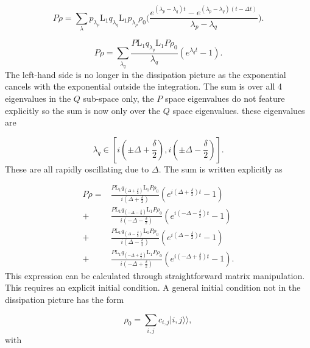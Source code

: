 \documentclass[12pt]{article}
\newcommand{\superket}[1]{|#1\rangle\rangle}
\begin{document}
\begin{equation}
    P\dot{\rho}=\sum_{\lambda} p_{\lambda_p} \mathrm{L}_1  q_{\lambda_q}\mathrm{L}_1p_{\lambda_p} \rho_0\Bigg(\frac{e^{(\lambda_p-\lambda_q)t}-e^{(\lambda_p-\lambda_q)(t-\Delta t)}}{\lambda_p-\lambda_q}\Bigg).
\end{equation}

\begin{equation}\label{eq:ProyectedEqNoAdiabatic}
    P\dot{\rho} = \sum_{\lambda_q} \frac{P \mathrm{L}_1  q_{\lambda_q}\mathrm{L}_1P\rho_0}{\lambda_q} (e^{\lambda_q t} -1).
\end{equation} The left-hand side is no longer in the dissipation picture as the exponential cancels with the exponential outside the integration. The sum is over all 4 eigenvalues in the $Q$ sub-space only, the $P$ space eigenvalues do not feature explicitly so the sum is now only over the $Q$ space eigenvalues. these eigenvalues are

\begin{equation}
    \lambda_q \in [ i(\pm\Delta+\frac{\delta}{2}), i(\pm\Delta - \frac{\delta}{2} )].
\end{equation} These are all rapidly oscillating due to $\Delta$. The sum is written explicitly as

\begin{align}
    P\dot{\rho} = &\frac{P \mathrm{L}_1  q_{(\Delta+\frac{\delta}{2})}\mathrm{L}_1P\rho_0}{i(\Delta+\frac{\delta}{2})}(e^{i(\Delta+\frac{\delta}{2})t}-1)\\
    +&\frac{P \mathrm{L}_1  q_{(-\Delta-\frac{\delta}{2})}\mathrm{L}_1P\rho_0}{i(-\Delta-\frac{\delta}{2})}(e^{i(-\Delta-\frac{\delta}{2})t}-1)\nonumber\\
    +&\frac{P \mathrm{L}_1  q_{(\Delta-\frac{\delta}{2})}\mathrm{L}_1P\rho_0}{i(\Delta-\frac{\delta}{2})}(e^{i(\Delta-\frac{\delta}{2})t}-1)\nonumber\\
    +&\frac{P \mathrm{L}_1  q_{(-\Delta+\frac{\delta}{2})}\mathrm{L}_1P\rho_0}{i(-\Delta+\frac{\delta}{2})}(e^{i(-\Delta+\frac{\delta}{2})t}-1). \nonumber
\end{align} This expression can be calculated through straightforward matrix manipulation. This requires an explicit initial condition. A general initial condition not in the dissipation picture has the form 

\begin{equation}
    \rho_0 = \sum_{i,j} c_{i,j}\superket{i,j}, 
\end{equation} with
\end{document}
